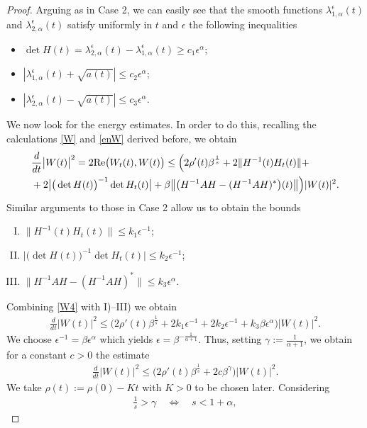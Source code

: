 \documentclass[12pt,oneside,a4paper]{book}
\numberwithin{equation}{section}     %
\theoremstyle{plain}
\theoremstyle{definition}
\newcommand{\Rep}{{\rm Re}}
\begin{document}
\begin{proof}
	Arguing as in Case 2, we can easily see that the smooth functions $\lambda^\epsilon_{1,\alpha}(t)$ and $\lambda^\epsilon_{2,\alpha}(t)$ satisfy uniformly in $t$ and $\epsilon$ the following inequalities
	\begin{itemize}
		\item $\det  H(t)=\lambda^\epsilon_{2,\alpha}(t)-\lambda^\epsilon_{1,\alpha}(t)\geq c_1\epsilon^\alpha$;
		\item $|\lambda^\epsilon_{1,\alpha}(t)+\sqrt {a(t)}|\leq c_2 \epsilon^\alpha$;
		\item $|\lambda^\epsilon_{2,\alpha}(t)-\sqrt{a(t)}|\leq c_3 \epsilon^\alpha$.
	\end{itemize}
	We now look for the energy estimates. In order to do this, recalling the calculations \eqref{W} and \eqref{enW} derived before, we obtain
	\begin{align}\notag
	&\frac{d}{dt}\big|W(t)\big|^2=2\Rep\big(W_t(t),W(t)\big)\leq \Big(2\rho'(t)\beta^{\frac{1}{s}}+2\|H^{-1}(t)H_t(t)\|+\\&+2\big|\big(\det H(t)\big)^{-1}\det H_t(t)\big|+\beta \big\|\big(H^{-1}AH-(H^{-1}AH)^*\big)(t)\big\| \Big)|W(t)|^2.\label{W4}
	\end{align}
	Similar arguments to those in Case 2 allow us to obtain the bounds
	\begin{enumerate}[I)]
		\item $\|H^{-1}(t)H_t(t)\|\leq k_1\epsilon^{-1}$;
		\item $\big|\big(\det H(t)\big)^{-1}\det H_t(t)\big|\leq k_2 \epsilon^{-1}$;
		\item $\|H^{-1}AH-(H^{-1}AH)^*\|\leq k_3 \epsilon^\alpha$.
	\end{enumerate}
	Combining \eqref{W4} with I)--III) we obtain 
	\begin{align*}
	\frac{d}{dt}|W(t)|^2\leq \Big(2\rho'(t)\beta^{\frac{1}{s}}+2k_1\epsilon^{-1}+2k_2 \epsilon^{-1}+ k_3 \beta \epsilon^\alpha \Big)|W(t)|^2.
	\end{align*}
	We choose $\epsilon^{-1}=\beta\epsilon^{\alpha}$ which yields $\epsilon=\beta^{-\frac{1}{\alpha+1}}$. Thus, setting $\gamma:=\frac{1}{\alpha+1}$, we obtain for a constant $c>0$ the estimate
	\begin{align*}
	\frac{d}{dt}|W(t)|^2\leq \Big(2\rho'(t)\beta^{\frac{1}{s}}+2c \beta^\gamma \Big)|W(t)|^2.
	\end{align*}
	We take $\rho(t):=\rho(0)-Kt$ with $K>0$ to be chosen later. 
	Considering 
	\begin{align*}
	\frac{1}{s}>\gamma\quad\iff\quad s< 1 +\alpha,

\end{align*}
\end{proof}
\end{document}
